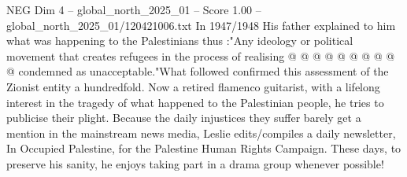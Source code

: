 \begin{textsample}{NEG Dim 4 – global\_north\_2025\_01 – Score 1.00 – global\_north\_2025\_01/120421006.txt}
In 1947/1948 His father explained to him what was happening to the Palestinians thus :"Any ideology or political movement that creates refugees in the process of realising @ @ @ @ @ @ @ @ @ @ condemned as unacceptable."What followed confirmed this assessment of the Zionist entity a hundredfold.
Now a retired flamenco guitarist, with a lifelong interest in the tragedy of what happened to the Palestinian people, he tries to publicise their plight.
Because the daily injustices they suffer barely get a mention in the mainstream news media, Leslie edits/compiles a daily newsletter, In Occupied Palestine, for the Palestine Human Rights Campaign.
These days, to preserve his sanity, he enjoys taking part in a drama group whenever possible!

\end{textsample}
